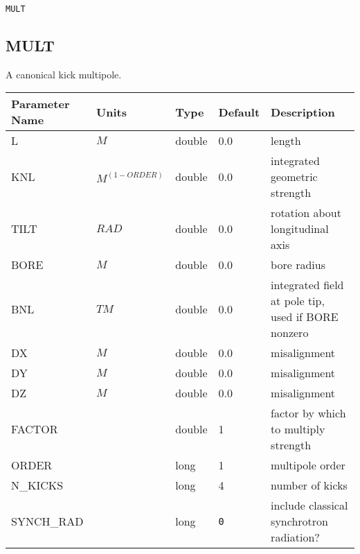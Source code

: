 \begin{latexonly}
\newpage
\begin{center}{\Large\verb|MULT|}\end{center}
\end{latexonly}\subsection{MULT}
A canonical kick multipole.
\\
\begin{tabular}{|l|l|l|l|p{\descwidth}|} \hline
Parameter Name & Units & Type & Default & Description \\ \hline 
L & $M$ & double &  0.0 & length  \\ \hline 
KNL & $M^{(1-ORDER)}$ & double &  0.0 & integrated geometric strength  \\ \hline 
TILT & $RAD$ & double &  0.0 & rotation about longitudinal axis  \\ \hline 
BORE & $M$ & double &  0.0 & bore radius  \\ \hline 
BNL & $T M$ & double &  0.0 & integrated field at pole tip, used if BORE nonzero  \\ \hline 
DX & $M$ & double &  0.0 & misalignment  \\ \hline 
DY & $M$ & double &  0.0 & misalignment  \\ \hline 
DZ & $M$ & double &  0.0 & misalignment  \\ \hline 
FACTOR &  & double &   1 & factor by which to multiply strength  \\ \hline 
ORDER &  & long &   1               & multipole order  \\ \hline 
N\_KICKS &  & long &   4               & number of kicks  \\ \hline 
SYNCH\_RAD &  & long &  \verb|0| & include classical synchrotron radiation?  \\ \hline 
\end{tabular}

